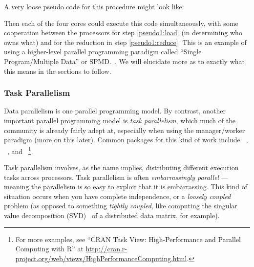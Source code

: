 A very loose pseudo code for this procedure might look like:


Then each of the four cores could execute this code simultaneously, with some
cooperation between the processors for step \ref{pseudo1:load} (in determining
who owns what) and for the reduction in step \ref{pseudo1:reduce}. This is
an example of using a higher-level parallel programming paradigm called
``Single Program/Multiple Data''
or SPMD.~.  We will elucidate more as to exactly what 
this means in the sections to follow.



\subsubsection{Task Parallelism}

Data parallelism is one parallel programming model. By contrast, another
important parallel programming model is \emph{task 
parallelism}, which much of the 
 community is already fairly adept at, especially when using the 
manager/worker paradigm (more on this 
later).  Common packages for this kind of work include 
~\citep{Tierney2012}, 
~\citep{parallel}, and 
~\citep{Rmpi}\footnote{For more examples, 
see ``CRAN Task View: High-Performance and Parallel Computing with R'' at 
\url{http://cran.r-project.org/web/views/HighPerformanceComputing.html}.}.

Task parallelism involves, as the name implies, distributing different execution
tasks across processors. Task parallelism is often \emph{embarrassingly 
parallel} --- meaning the 
parallelism is so easy to exploit that it is embarrassing. This kind of 
situation occurs when you have complete independence, or a \emph{loosely 
coupled} problem (as opposed to something 
\emph{tightly coupled}, like computing the 
singular value decomposition (SVD)~ of a distributed data matrix, for 
example).  

